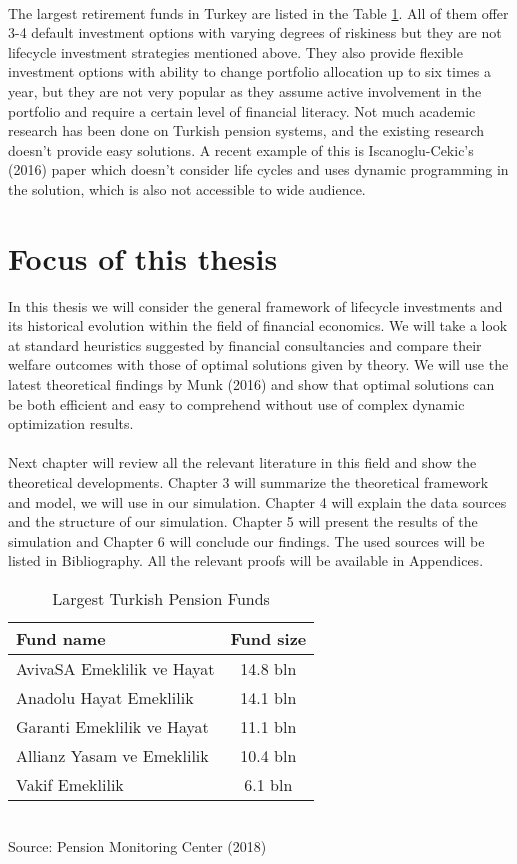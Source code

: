 \paragraph*{}
The largest retirement funds in Turkey are listed in the Table \ref{table:emekli}. All of them offer 3-4 default investment options with varying degrees of riskiness but they are not lifecycle investment strategies mentioned above. They also provide flexible investment options with ability to change portfolio allocation up to six times a year, but they are not very popular as they assume active involvement in the portfolio and require a certain level of financial literacy. Not much academic research has been done on Turkish pension systems, and the existing research doesn't provide easy solutions. A recent example of this is Iscanoglu-Cekic's (2016) paper which doesn't consider life cycles and uses dynamic programming in the solution, which is also not accessible to wide audience.

\section{Focus of this thesis}
In this thesis we will consider the general framework of lifecycle investments and its historical evolution within the field of financial economics. We will take a look at standard heuristics suggested by financial consultancies and compare their welfare outcomes with those of optimal solutions given by theory. We will use the latest theoretical findings by Munk (2016) and show that optimal solutions can be both efficient and easy to comprehend without use of complex dynamic optimization results.
\paragraph*{}Next chapter will review all the relevant literature in this field and show the theoretical developments. Chapter 3 will summarize the theoretical framework and model, we will use in our simulation. Chapter 4 will explain the data sources and the structure of our simulation. Chapter 5 will present the results of the simulation and Chapter 6 will conclude our findings. The used sources will be listed in Bibliography. All the relevant proofs will be available in Appendices. 

\begin{table}
	\centering
	\caption{Largest Turkish Pension Funds}
	\label{table:emekli}
	\begin{tabular}[H]{lc}
		\hline
		Fund name&Fund size\\
		\hline
		AvivaSA Emeklilik ve Hayat&14.8 bln\\
		Anadolu Hayat Emeklilik&14.1 bln\\
		Garanti Emeklilik ve Hayat&11.1 bln\\
		Allianz Yasam ve Emeklilik&10.4 bln\\
		Vakif Emeklilik&6.1 bln\\
		\hline
	\end{tabular}\\
	Source: Pension Monitoring Center (2018)
\end{table}
